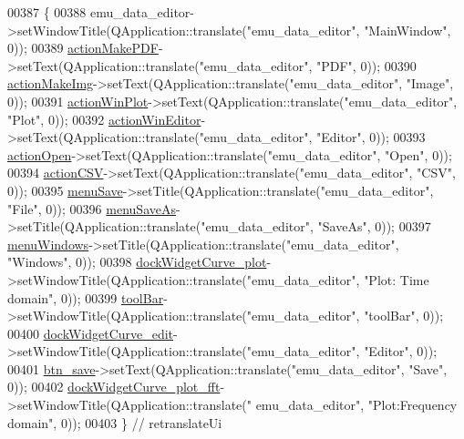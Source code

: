 \begin{DoxyCode}
00387     \{
00388         emu\_data\_editor->setWindowTitle(QApplication::translate(\textcolor{stringliteral}{"emu\_data\_editor"}, \textcolor{stringliteral}{"MainWindow"}, 0));
00389         \hyperlink{a00026_af013c084ff0ed9ae39a60aa7a39bdd91}{actionMakePDF}->setText(QApplication::translate(\textcolor{stringliteral}{"emu\_data\_editor"}, \textcolor{stringliteral}{"PDF"}, 0));
00390         \hyperlink{a00026_a345313e538e5ef49cd27c1fc0bdd4173}{actionMakeImg}->setText(QApplication::translate(\textcolor{stringliteral}{"emu\_data\_editor"}, \textcolor{stringliteral}{"Image"}, 0));
00391         \hyperlink{a00026_a0aeb289d8df9db6f4329e9000e44d511}{actionWinPlot}->setText(QApplication::translate(\textcolor{stringliteral}{"emu\_data\_editor"}, \textcolor{stringliteral}{"Plot"}, 0));
00392         \hyperlink{a00026_aa5d56420958ab4fd1239e29714d75e18}{actionWinEditor}->setText(QApplication::translate(\textcolor{stringliteral}{"emu\_data\_editor"}, \textcolor{stringliteral}{"Editor"}, 0));
00393         \hyperlink{a00026_a3ceb57268680eb23f6a3d522b303bb43}{actionOpen}->setText(QApplication::translate(\textcolor{stringliteral}{"emu\_data\_editor"}, \textcolor{stringliteral}{"Open"}, 0));
00394         \hyperlink{a00026_afae3d61aac77b6c20a7953b3adba9672}{actionCSV}->setText(QApplication::translate(\textcolor{stringliteral}{"emu\_data\_editor"}, \textcolor{stringliteral}{"CSV"}, 0));
00395         \hyperlink{a00026_a36a184d4c55f5de1b542257cbe23adaf}{menuSave}->setTitle(QApplication::translate(\textcolor{stringliteral}{"emu\_data\_editor"}, \textcolor{stringliteral}{"File"}, 0));
00396         \hyperlink{a00026_a2568794cbc6cc9907104efbfd79eba7d}{menuSaveAs}->setTitle(QApplication::translate(\textcolor{stringliteral}{"emu\_data\_editor"}, \textcolor{stringliteral}{"SaveAs"}, 0));
00397         \hyperlink{a00026_a0c7cba2d30d21689f48f1981e976c0b6}{menuWindows}->setTitle(QApplication::translate(\textcolor{stringliteral}{"emu\_data\_editor"}, \textcolor{stringliteral}{"Windows"}, 0));
00398         \hyperlink{a00026_a0edc87fb115fede171c0da1f99000874}{dockWidgetCurve\_plot}->setWindowTitle(QApplication::translate(\textcolor{stringliteral}{"emu\_data\_editor"},
       \textcolor{stringliteral}{"Plot: Time domain"}, 0));
00399         \hyperlink{a00026_a884ecf47fc47f20bd60e9406b1ef88f1}{toolBar}->setWindowTitle(QApplication::translate(\textcolor{stringliteral}{"emu\_data\_editor"}, \textcolor{stringliteral}{"toolBar"}, 0));
00400         \hyperlink{a00026_a83360bdd61e994537715aa7c38e4e5b6}{dockWidgetCurve\_edit}->setWindowTitle(QApplication::translate(\textcolor{stringliteral}{"emu\_data\_editor"},
       \textcolor{stringliteral}{"Editor"}, 0));
00401         \hyperlink{a00026_a3b0808ff0825375685673655eb4785fc}{btn\_save}->setText(QApplication::translate(\textcolor{stringliteral}{"emu\_data\_editor"}, \textcolor{stringliteral}{"Save"}, 0));
00402         \hyperlink{a00026_a7474d72172d9e269e8f3cb22bbe2fc86}{dockWidgetCurve\_plot\_fft}->setWindowTitle(QApplication::translate(\textcolor{stringliteral}{"
      emu\_data\_editor"}, \textcolor{stringliteral}{"Plot:Frequency domain"}, 0));
00403     \} \textcolor{comment}{// retranslateUi}
\end{DoxyCode}


